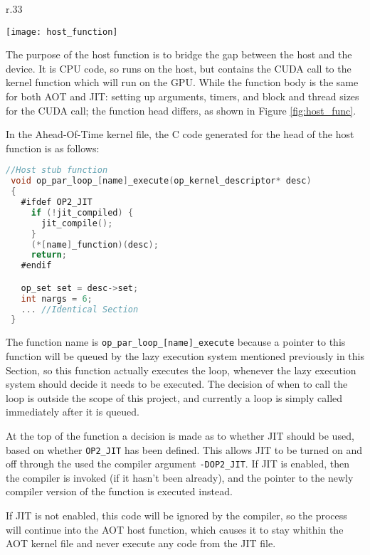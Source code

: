 \begin{wrapfigure}[8]{r}{.33\textwidth}
  \vspace{-1.5cm}
  \centering
  \caption{Host Function}
  \label{fig:host_func}
  \texttt{[image: host\_function]}
\end{wrapfigure}
The purpose of the host function is to bridge the gap between the host and the device. It is CPU code, so runs on the host, but contains the CUDA call to the kernel function which will run on the GPU. While the function body is the same for both AOT and JIT: setting up arguments, timers, and block and thread sizes for the CUDA call; the function head differs, as shown in Figure \ref{fig:host_func}.
\vspace{\parskip}

In the Ahead-Of-Time kernel file, the C code generated for the head of the host function is as follows:

\begin{lstlisting}[linewidth = \textwidth, framesep=0pt, language=C, linebackgroundcolor={\ifnum\value{lstnumber}=14\color{red!20} \else \color{blue!20} \fi}]
 //Host stub function
 void op_par_loop_[name]_execute(op_kernel_descriptor* desc)
 {
   #ifdef OP2_JIT
     if (!jit_compiled) {
       jit_compile();
     }
     (*[name]_function)(desc);
     return;
   #endif

   op_set set = desc->set;
   int nargs = 6;
   ... //Identical Section
 }
\end{lstlisting}
\vspace{-1em}
The function name is \verb|op_par_loop_[name]_execute| because a pointer to this function will be queued by the lazy execution system mentioned previously in this Section, so this function actually executes the loop, whenever the lazy execution system should decide it needs to be executed. The decision of when to call the loop is outside the scope of this project, and currently a loop is simply called immediately after it is queued.
\par At the top of the function a decision is made as to whether JIT should be used, based on whether \verb|OP2_JIT| has been defined. This allows JIT to be turned on and off through the used the compiler argument \verb|-DOP2_JIT|. If JIT is enabled, then the compiler is invoked (if it hasn't been already), and the pointer to the newly compiler version of the function is executed instead.
\par
If JIT is not enabled, this code will be ignored by the compiler, so the process will continue into the AOT host function, which causes it to stay whithin the AOT kernel file and never execute any code from the JIT file.

